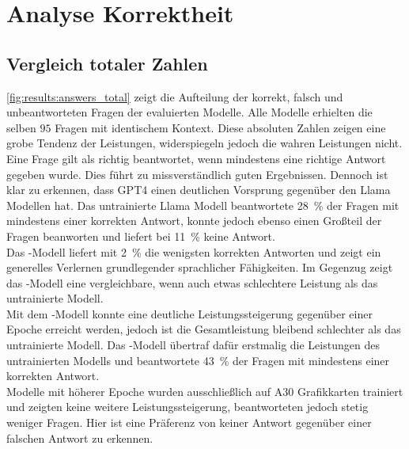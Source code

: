 \section{Analyse Korrektheit}\label{sec:results:correctness}
\subsection{Vergleich totaler Zahlen}

\cref{fig:results:answers_total} zeigt die Aufteilung der korrekt, falsch und unbeantworteten Fragen der evaluierten Modelle.
Alle Modelle erhielten die selben $95$ Fragen mit identischem Kontext.
Diese absoluten Zahlen zeigen eine grobe Tendenz der Leistungen, widerspiegeln jedoch die wahren Leistungen nicht.
Eine Frage gilt als richtig beantwortet, wenn mindestens eine richtige Antwort gegeben wurde.
Dies führt zu missverständlich guten Ergebnissen.
Dennoch ist klar zu erkennen, dass GPT4 einen deutlichen Vorsprung gegenüber den Llama Modellen hat.
Das untrainierte Llama Modell beantwortete \SI{28}{\percent} der Fragen mit mindestens einer korrekten Antwort, konnte jedoch ebenso einen Großteil der Fragen beanworten und liefert bei \SI{11}{\percent} keine Antwort.\\

Das \liv-Modell liefert mit \SI{2}{\percent} die wenigsten korrekten Antworten und zeigt ein generelles Verlernen grundlegender sprachlicher Fähigkeiten.
Im Gegenzug zeigt das \lia-Modell eine vergleichbare, wenn auch etwas schlechtere Leistung als das untrainierte Modell.\\

Mit dem \lev-Modell konnte eine deutliche Leistungssteigerung gegenüber einer Epoche erreicht werden, jedoch ist die Gesamtleistung bleibend schlechter als das untrainierte Modell.
Das \lea-Modell übertraf dafür erstmalig die Leistungen des untrainierten Modells und beantwortete \SI{43}{\percent} der Fragen mit mindestens einer korrekten Antwort.\\

Modelle mit höherer Epoche wurden ausschließlich auf A30 Grafikkarten trainiert und zeigten keine weitere Leistungssteigerung, beantworteten jedoch stetig weniger Fragen.
Hier ist eine Präferenz von keiner Antwort gegenüber einer falschen Antwort zu erkennen.\\

